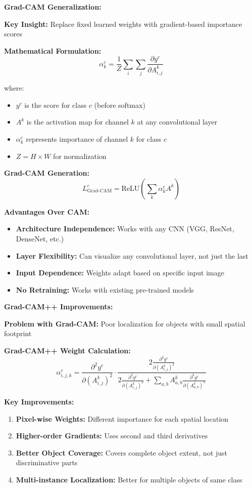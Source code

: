\documentclass[12pt]{article}
\begin{document}
\begin{enumerate}[(a)]
{    \textbf{Grad-CAM Generalization:}
    
    \textbf{Key Insight:} Replace fixed learned weights with gradient-based importance scores
    
    \textbf{Mathematical Formulation:}
    $$\alpha_k^c = \frac{1}{Z} \sum_i \sum_j \frac{\partial y^c}{\partial A_{i,j}^k}$$
    
    where:
    \begin{itemize}
        \item $y^c$ is the score for class $c$ (before softmax)
        \item $A^k$ is the activation map for channel $k$ at any convolutional layer
        \item $\alpha_k^c$ represents importance of channel $k$ for class $c$
        \item $Z = H \times W$ for normalization
    \end{itemize}
    
    \textbf{Grad-CAM Generation:}
    $$L_{\text{Grad-CAM}}^c = \text{ReLU}\left(\sum_k \alpha_k^c A^k\right)$$
    
    \textbf{Advantages Over CAM:}
    \begin{itemize}
        \item \textbf{Architecture Independence:} Works with any CNN (VGG, ResNet, DenseNet, etc.)
        \item \textbf{Layer Flexibility:} Can visualize any convolutional layer, not just the last
        \item \textbf{Input Dependence:} Weights adapt based on specific input image
        \item \textbf{No Retraining:} Works with existing pre-trained models
    \end{itemize}
    
    \textbf{Grad-CAM++ Improvements:}
    
    \textbf{Problem with Grad-CAM:} Poor localization for objects with small spatial footprint
    
    \textbf{Grad-CAM++ Weight Calculation:}
    $$\alpha_{i,j,k}^c = \frac{\partial^2 y^c}{\partial (A_{i,j}^k)^2} \cdot \frac{2 \frac{\partial^2 y^c}{\partial (A_{i,j}^k)^2}}{2 \frac{\partial^2 y^c}{\partial (A_{i,j}^k)^2} + \sum_{a,b} A_{a,b}^k \frac{\partial^3 y^c}{\partial (A_{a,b}^k)^3}}$$
    
    \textbf{Key Improvements:}
    \begin{enumerate}
        \item \textbf{Pixel-wise Weights:} Different importance for each spatial location
        \item \textbf{Higher-order Gradients:} Uses second and third derivatives
        \item \textbf{Better Object Coverage:} Covers complete object extent, not just discriminative parts
        \item \textbf{Multi-instance Localization:} Better for multiple objects of same class
    \end{enumerate}
    
}
\end{enumerate}
\end{document}
